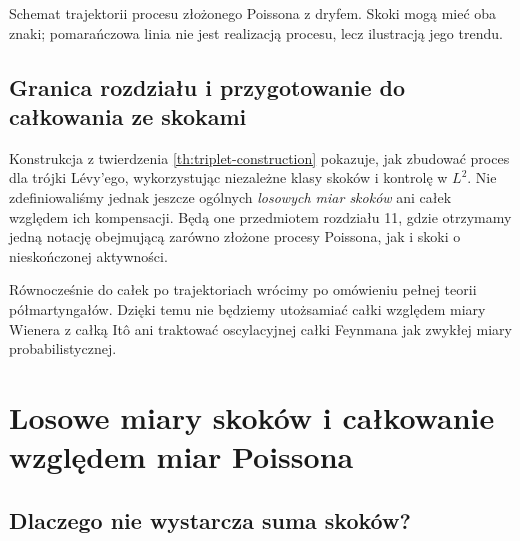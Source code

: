 \documentclass[11pt,a4paper,oneside]{report}
\numberwithin{equation}{chapter}
\theoremstyle{plain}
\theoremstyle{definition}
\theoremstyle{remark}
\begin{document}
\begin{center}
\par\smallskip\small Schemat trajektorii procesu złożonego Poissona
z dryfem. Skoki mogą mieć oba znaki; pomarańczowa linia
nie jest realizacją procesu, lecz ilustracją jego trendu.
\end{center}

\section{Granica rozdziału i przygotowanie do całkowania ze skokami}
Konstrukcja z twierdzenia \ref{th:triplet-construction}
pokazuje, jak zbudować proces dla trójki Lévy'ego,
wykorzystując niezależne klasy skoków i kontrolę w $L^2$.
Nie zdefiniowaliśmy jednak jeszcze ogólnych \emph{losowych
miar skoków} ani całek względem ich kompensacji.
Będą one przedmiotem rozdziału 11, gdzie otrzymamy
jedną notację obejmującą zarówno złożone procesy Poissona,
jak i skoki o nieskończonej aktywności.

Równocześnie do całek po trajektoriach wrócimy po omówieniu
pełnej teorii półmartyngałów. Dzięki temu nie będziemy
utożsamiać całki względem miary Wienera z całką Itô
ani traktować oscylacyjnej całki Feynmana jak zwykłej
miary probabilistycznej.

\chapter{Losowe miary skoków i całkowanie względem miar Poissona}
\label{ch:poisson-random-measure}

\section{Dlaczego nie wystarcza suma skoków?}
\end{document}
